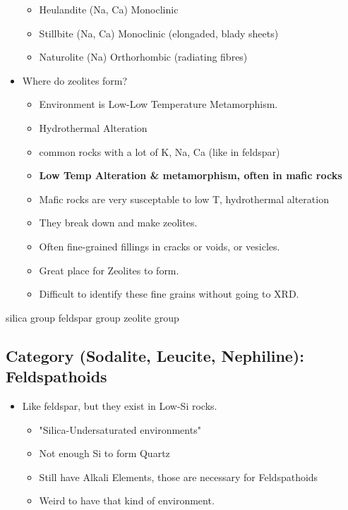 \documentclass[11pt]{article}
\begin{document}
\begin{itemize}
\begin{itemize}
\item Heulandite (Na, Ca) Monoclinic
\item Stillbite (Na, Ca) Monoclinic (elongaded, blady sheets)
\item Naturolite (Na) Orthorhombic (radiating fibres)
\end{itemize}
\item Where do zeolites form?
\begin{itemize}
\item Environment is Low-Low Temperature Metamorphism.
\item Hydrothermal Alteration
\item common rocks with a lot of K, Na, Ca (like in feldspar)
\item \textbf{Low Temp Alteration \& metamorphism, often in mafic rocks}
\item Mafic rocks are very susceptable to low T, hydrothermal alteration
\item They break down and make zeolites.
\item Often fine-grained fillings in cracks or voids, or vesicles.
\item Great place for Zeolites to form.
\item Difficult to identify these fine grains without going to XRD.
\end{itemize}
\end{itemize}


silica group
feldspar group
zeolite group
\subsection{Category (Sodalite, Leucite, Nephiline): Feldspathoids}
\label{sec-2-2}

\begin{itemize}
\item Like feldspar, but they exist in Low-Si rocks.
\begin{itemize}
\item "Silica-Undersaturated environments"
\item Not enough Si to form Quartz
\item Still have Alkali Elements, those are necessary for Feldspathoids
\item Weird to have that kind of environment.
\end{itemize}
\end{itemize}
\end{document}
